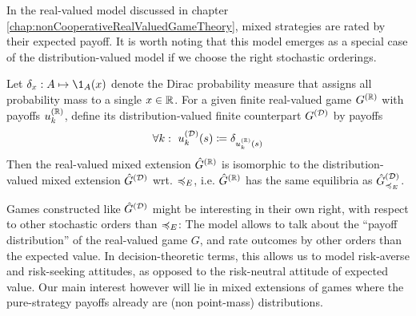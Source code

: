 \documentclass[a4paper]{scrreprt}
\begin{document}
    In the real-valued model discussed in chapter \ref{chap:nonCooperativeRealValuedGameTheory}, mixed strategies are rated by their expected payoff. It is worth noting that this model emerges as a special case of the distribution-valued model if we choose the right stochastic orderings.
    \begin{ex}
        Let $\delta_x: A \mapsto \1_A(x)$ denote the Dirac probability measure that assigns all probability mass to a single $x \in \mathbb{R}$.
        For a given finite real-valued game $G^{(\mathbb{R})}$ with payoffs $u_k^{(\mathbb{R})}$, define its distribution-valued finite counterpart $G^{(\mathcal{D})}$ by payoffs
        \begin{gather*}
            \forall k: ~u_k^{(\mathcal{D})}(s) \coloneqq \delta_{u_k^{(\mathbb{R})}(s)} 
        \end{gather*}
        Then the real-valued mixed extension $\hat{G}^{(\mathbb{R})}$ is isomorphic to the distribution-valued mixed extension $\hat{G}^{(\mathcal{D})}$ wrt. $\preccurlyeq_E$, i.e. 
        $\hat{G}^{(\mathbb{R})}$ has the same equilibria as $\hat{G}^{(\mathcal{D})}_{\preccurlyeq_E}$.
    \end{ex}
    Games constructed like $\hat{G}^{(\mathcal{D})}$ might be interesting in their own right, with respect to other stochastic orders than $\preccurlyeq_E$:
    The model allows to talk about the “payoff distribution” of the real-valued game $G$, and rate outcomes by other orders than the expected value. 
    In decision-theoretic terms, this allows us to model risk-averse and risk-seeking attitudes, as opposed to the risk-neutral attitude of expected value. Our main interest however will lie in mixed extensions of games where the pure-strategy payoffs already are (non point-mass) distributions.

    
\end{document}

